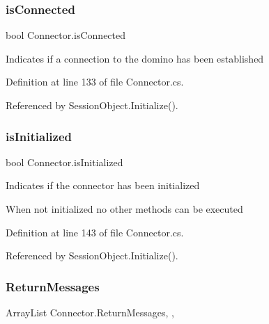\mbox{\label{class_connector_acf2c3b519c360d02ed54543a01d199af}} 
\subsubsection{\texorpdfstring{is\+Connected}{isConnected}}
{\footnotesize\ttfamily bool Connector.\+is\+Connected\hspace{0.3cm}{\ttfamily [get]}}



Indicates if a connection to the domino has been established 



Definition at line 133 of file Connector.\+cs.



Referenced by Session\+Object.\+Initialize().

\mbox{\label{class_connector_a017d40b1f4cf2cbaa5d4b755cf09269e}} 
\subsubsection{\texorpdfstring{is\+Initialized}{isInitialized}}
{\footnotesize\ttfamily bool Connector.\+is\+Initialized\hspace{0.3cm}{\ttfamily [get]}}



Indicates if the connector has been initialized 

When not initialized no other methods can be executed

Definition at line 143 of file Connector.\+cs.



Referenced by Session\+Object.\+Initialize().

\mbox{\label{class_connector_a1ed422674b344524fd77998dcf6a9ba6}} 
\subsubsection{\texorpdfstring{Return\+Messages}{ReturnMessages}}
{\footnotesize\ttfamily Array\+List Connector.\+Return\+Messages\hspace{0.3cm}{\ttfamily [static]}, {\ttfamily [get]}, {\ttfamily [set]}}



